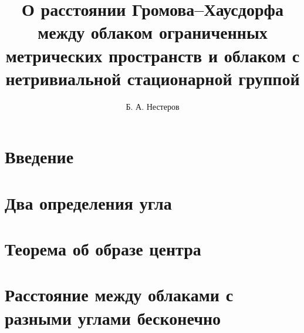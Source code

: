 \documentclass[11pt,twoside,draft
]{article}
\title
{%
  О расстоянии Громова--Хаусдорфа между облаком ограниченных
  метрических пространств и облаком с нетривиальной стационарной группой
}
{%
  On the Gromov--Hausdorff distance between the cloud of bounded
metric spaces and a cloud with nontrivial stabilizer}
\author
{%
Б. А. Нестеров}
{%
B. A. Nesterov}
\begin{document}
\maketitle
\newpage

\section{Введение}  


\section{Два определения угла}  

\section{Теорема об образе центра} 

\section{Расстояние между облаками с разными углами бесконечно}

\label{end}


\end{document}
